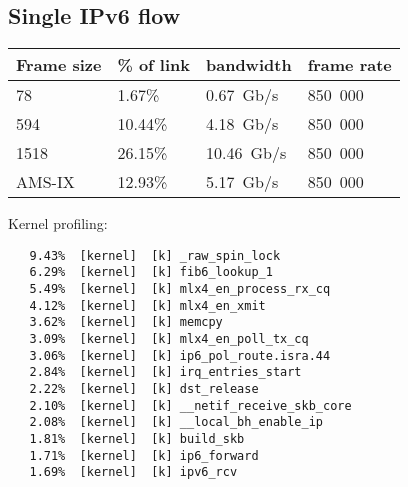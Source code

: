 
\subsection{Single IPv6 flow}
\begin{tabular}{ | l | l | l | l | }
\hline
Frame size & \% of link & bandwidth & frame rate \\
\hline
78     &  1.67\% &  0.67~Gb/s & 850~000 \\
594    & 10.44\% &  4.18~Gb/s & 850~000 \\
1518   & 26.15\% & 10.46~Gb/s & 850~000 \\
AMS-IX & 12.93\% &  5.17~Gb/s & 850~000 \\
\hline
\end{tabular}

Kernel profiling:
\begin{lstlisting}
   9.43%  [kernel]  [k] _raw_spin_lock
   6.29%  [kernel]  [k] fib6_lookup_1
   5.49%  [kernel]  [k] mlx4_en_process_rx_cq
   4.12%  [kernel]  [k] mlx4_en_xmit
   3.62%  [kernel]  [k] memcpy
   3.09%  [kernel]  [k] mlx4_en_poll_tx_cq
   3.06%  [kernel]  [k] ip6_pol_route.isra.44
   2.84%  [kernel]  [k] irq_entries_start
   2.22%  [kernel]  [k] dst_release
   2.10%  [kernel]  [k] __netif_receive_skb_core
   2.08%  [kernel]  [k] __local_bh_enable_ip
   1.81%  [kernel]  [k] build_skb
   1.71%  [kernel]  [k] ip6_forward
   1.69%  [kernel]  [k] ipv6_rcv
\end{lstlisting}
